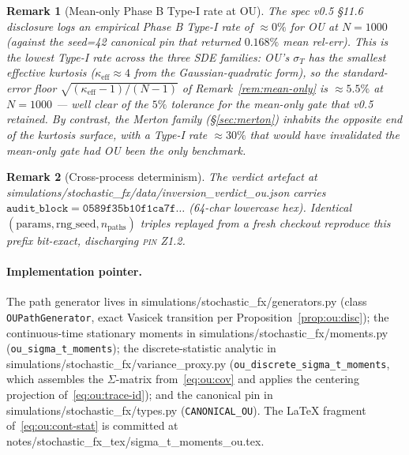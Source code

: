 \documentclass[11pt,letterpaper]{article}
\newtheorem{remark}{Remark}[section]
\newcommand{\sigmaT}{\sigma_{T}}
\newcommand{\PinZ}[1]{\textsc{pin Z1.#1}}
\begin{document}
\begin{remark}[Mean-only Phase B Type-I rate at OU]
\label{rem:ou:type-i}
The spec v0.5 \S11.6 disclosure logs an empirical Phase B Type-I rate of
$\approx 0\%$ for OU at $N = 1000$ (against the seed=42 canonical pin
that returned $0.168\%$ mean rel-err). This is the lowest Type-I rate
across the three SDE families: OU's $\sigmaT$ has the smallest effective
kurtosis ($\kappa_{\text{eff}} \approx 4$ from the Gaussian-quadratic form),
so the standard-error floor $\sqrt{(\kappa_{\text{eff}} - 1)/(N - 1)}$ of
Remark~\ref{rem:mean-only} is $\approx 5.5\%$ at $N = 1000$ — well clear
of the $5\%$ tolerance for the mean-only gate that v0.5 retained. By
contrast, the Merton family (\S\ref{sec:merton}) inhabits the opposite
end of the kurtosis surface, with a Type-I rate $\approx 30\%$ that
\emph{would} have invalidated the mean-only gate had OU been the only
benchmark.
\end{remark}

\begin{remark}[Cross-process determinism]
\label{rem:ou:audit}
The verdict artefact at
\textsf{simulations/stochastic\_fx/data/inversion\_verdict\_ou.json}
carries
\(
    \texttt{audit\_block} = \texttt{0589f35b10f1ca7f}\ldots
\)
(64-char lowercase hex). Identical
$(\text{params}, \text{rng\_seed}, n_{\text{paths}})$ triples replayed
from a fresh checkout reproduce this prefix bit-exact, discharging
\PinZ{2}.
\end{remark}

\paragraph{Implementation pointer.}
The path generator lives in
\textsf{simulations/stochastic\_fx/generators.py}
(class \texttt{OUPathGenerator}, exact Vasicek transition per
Proposition~\ref{prop:ou:disc}); the continuous-time stationary moments
in \textsf{simulations/stochastic\_fx/moments.py}
(\texttt{ou\_sigma\_t\_moments}); the discrete-statistic analytic
in \textsf{simulations/stochastic\_fx/variance\_proxy.py}
(\texttt{ou\_discrete\_sigma\_t\_moments}, which assembles the
$\Sigma$-matrix from~\eqref{eq:ou:cov} and applies the centering
projection of~\eqref{eq:ou:trace-id}); and the canonical pin in
\textsf{simulations/stochastic\_fx/types.py}
(\texttt{CANONICAL\_OU}). The LaTeX fragment of~\eqref{eq:ou:cont-stat}
is committed at
\textsf{notes/stochastic\_fx\_tex/sigma\_t\_moments\_ou.tex}.

\end{document}
